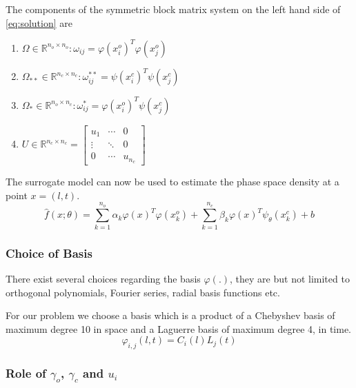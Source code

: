%
The components of the symmetric block matrix system on the left hand side of 
\cref{eq:solution} are 
\begin{enumerate}
\item $\Omega \in \mathbb{R}^{n_{o} \times n_{o}}: \omega_{ij} = \varphi(x^{o}_{i})^{T} \varphi(x^{o}_{j})$
\item $\Omega_{**} \in \mathbb{R}^{n_{c} \times n_{c}}: \omega^{**}_{ij} = \psi(x^{c}_{i})^{T} \psi(x^{c}_{j})$
\item $\Omega_{*} \in \mathbb{R}^{n_{o} \times n_{c}}: \omega^{*}_{ij} = \varphi(x^{o}_{i})^{T} \psi(x^{c}_{j})$
\item $U \in \mathbb{R}^{n_{c} \times n_{c}} = \begin{bmatrix}
    u_1 & \cdots & 0 \\ 
    \vdots & \ddots  & 0\\ 
    0 & \cdots  & u_{n_{c}} 
  \end{bmatrix}$
\end{enumerate}
%
The surrogate model can now be used to estimate the phase space density 
at a point $x = (l,t)$.
%
\begin{equation}\label{eq:model}
\hat{f}(x;\theta) = \sum_{k = 1}^{n_{o}}{\alpha_{k}\varphi(x)^{T}\varphi(x^{o}_{k}) + \sum_{k = 1}^{n_{c}}}{\beta_{k} \varphi(x)^{T} \psi_{\theta}(x^{c}_{k})} + b
\end{equation}

\subsubsection*{Choice of Basis}

There exist several choices regarding the basis $\varphi(.)$, they are but not limited to 
orthogonal polynomials, Fourier series, radial basis functions etc. 

For our problem we choose a basis which is a product of a Chebyshev basis of maximum degree 10 in space and a Laguerre basis of maximum degree 4, in time.
%
\begin{equation}\label{eq:basis}
\varphi_{i,j}(l,t) = C_{i}(l) L_{j}(t)
\end{equation}
%


\subsubsection*{Role of $\gamma_o$, $\gamma_c$ and $u_i$}

